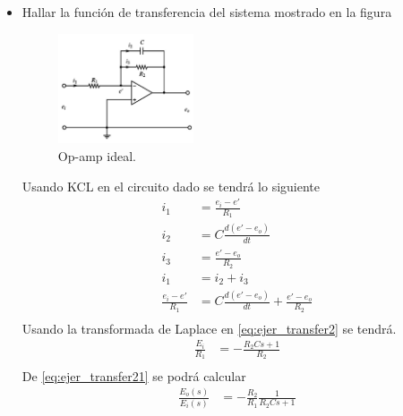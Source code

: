 \documentclass[12pt]{article}
\begin{document}
\begin{itemize}
    \item Hallar la función de transferencia del sistema mostrado en la figura
    \begin{figure}[h]
        \centering
            \includegraphics[width=4cm]{IMAGENES/transfer2}
            \caption{Op-amp ideal.}
    \end{figure}
    Usando KCL en el circuito dado se tendrá lo siguiente 
    \begin{equation}
        \begin{split}
            i_{1}&=\frac{e_{i}-e'}{R_{1}}\\
            i_{2}&=C\frac{d(e'-e_{o})}{dt}\\
            i_{3}&=\frac{e'-e_{o}}{R_{2}}\\
            i_{1}&=i_{2}+i_{3}\\
            \frac{e_{i}-e'}{R_{1}}&=C\frac{d(e'-e_{o})}{dt}+\frac{e'-e_{o}}{R_{2}}\\
        \end{split}
        \label{eq:ejer_transfer2}
    \end{equation}
    Usando la transformada de Laplace en \ref{eq:ejer_transfer2} se tendrá.
    \begin{equation}
        \begin{split}
            \frac{E_{i}}{R_{1}}&=-\frac{R_{2}Cs+1}{R_{2}}\\
        \end{split}
        \label{eq:ejer_transfer21}
    \end{equation}
    De \ref{eq:ejer_transfer21} se podrá calcular
    \begin{equation}
        \begin{split}
        \frac{E_{o}(s)}{E_{i}(s)}&=-\frac{R_{2}}{R_{1}}\frac{1}{R_{2}Cs+1}\\
        \end{split}
    \label{eq:ejer_transfer22}
    \end{equation}


\end{itemize}
\end{document}
